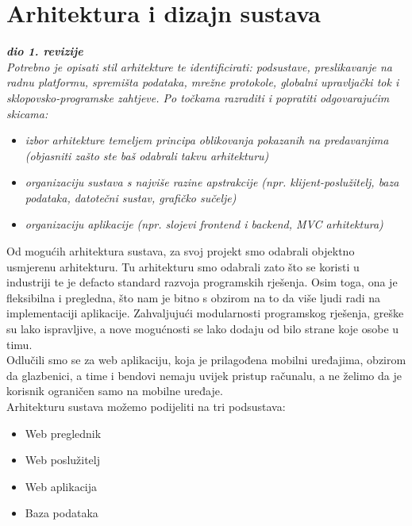 \chapter{Arhitektura i dizajn sustava}
		
		\textbf{\textit{dio 1. revizije}}\\

		\textit{ Potrebno je opisati stil arhitekture te identificirati: podsustave, preslikavanje na radnu platformu, spremišta podataka, mrežne protokole, globalni upravljački tok i sklopovsko-programske zahtjeve. Po točkama razraditi i popratiti odgovarajućim skicama:}
	\begin{itemize}
		\item 	\textit{izbor arhitekture temeljem principa oblikovanja pokazanih na predavanjima (objasniti zašto ste baš odabrali takvu arhitekturu)}
		\item 	\textit{organizaciju sustava s najviše razine apstrakcije (npr. klijent-poslužitelj, baza podataka, datotečni sustav, grafičko sučelje)}
		\item 	\textit{organizaciju aplikacije (npr. slojevi frontend i backend, MVC arhitektura) }		
	\end{itemize}
	
	Od mogućih arhitektura sustava, za svoj projekt smo odabrali objektno usmjerenu arhitekturu. Tu arhitekturu smo odabrali zato što se koristi u industriji te je defacto standard razvoja programskih rješenja. Osim toga, ona je fleksibilna i pregledna, što nam je bitno s obzirom na to da više ljudi radi na implementaciji aplikacije. Zahvaljujući modularnosti programskog rješenja, greške su lako ispravljive, a nove mogućnosti se lako dodaju od bilo strane koje osobe u timu.\\

	Odlučili smo se za web aplikaciju, koja je prilagođena mobilni uređajima, obzirom da glazbenici, a time i bendovi nemaju uvijek pristup računalu, a ne želimo da je korisnik ograničen samo na mobilne uređaje.\\

	Arhitekturu sustava možemo podijeliti na tri podsustava:
		\begin{itemize}
			\item Web preglednik
			\item Web poslužitelj
    			\item Web aplikacija
			\item Baza podataka
		\end{itemize}


